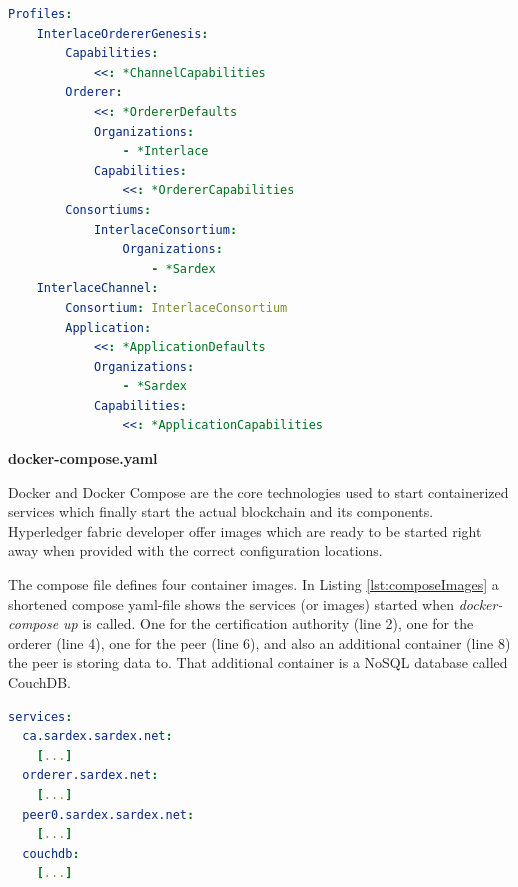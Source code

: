 \begin{center}
\begin{minipage}{0.8\textwidth}
\small
\begin{lstlisting}[language=yaml,firstnumber=1,caption={\bf\small configtx.yaml excerpt -- Profiles definition}, captionpos=b,label=lst:configTxProfiles]
Profiles:
    InterlaceOrdererGenesis:
        Capabilities:
            <<: *ChannelCapabilities
        Orderer:
            <<: *OrdererDefaults
            Organizations:
                - *Interlace
            Capabilities:
                <<: *OrdererCapabilities
        Consortiums:
            InterlaceConsortium:
                Organizations:
                    - *Sardex
    InterlaceChannel:
        Consortium: InterlaceConsortium
        Application:
            <<: *ApplicationDefaults
            Organizations:
                - *Sardex
            Capabilities:
                <<: *ApplicationCapabilities
\end{lstlisting}
\end{minipage}
\end{center}

\textbf{docker-compose.yaml}

Docker and Docker Compose are the core technologies used to start containerized services which finally start the actual blockchain and its components. Hyperledger fabric developer offer images which are ready to be started right away when provided with the correct configuration locations.

The compose file defines four container images. In Listing \ref{lst:composeImages} a shortened compose yaml-file shows the services (or images) started when \textit{docker-compose up} is called. One for the certification authority (line 2), one for the orderer (line 4), one for the peer (line 6), and also an additional container (line 8) the peer is storing data to. That additional container is a NoSQL database called CouchDB. 

\begin{center}
\begin{minipage}{0.8\textwidth}
\small
\begin{lstlisting}[language=yaml,firstnumber=1,caption={\bf\small docker-compose.yaml excerpt}, captionpos=b,label=lst:composeImages]
services:
  ca.sardex.sardex.net:
    [...]
  orderer.sardex.net:
    [...]
  peer0.sardex.sardex.net:
    [...]
  couchdb:
    [...]
\end{lstlisting}
\end{minipage}
\end{center}

